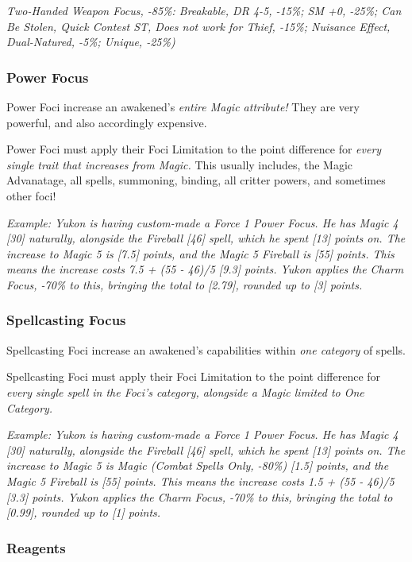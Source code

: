 \begin{multicols*}{2}
	\textcolor{OliveGreen}{\textit{Two-Handed Weapon Focus, -85\%: Breakable, DR 4-5, -15\%; SM +0, -25\%; Can Be Stolen, Quick Contest ST, Does not work for Thief, -15\%; Nuisance Effect, Dual-Natured, -5\%; Unique, -25\%)}}
	
	\subsubsection{Power Focus} Power Foci increase an awakened's \textit{entire Magic attribute!} They are very powerful, and also accordingly expensive.
	
	Power Foci must apply their Foci Limitation to the point difference for \textit{every single trait that increases from Magic.} This usually includes, the Magic Advanatage, all spells, summoning, binding, all critter powers, and sometimes other foci!
	
	\textcolor{OliveGreen}{\textit{Example: Yukon is having custom-made a Force 1 Power Focus. He has Magic 4 [30] naturally, alongside the Fireball [46] spell, which he spent [13] points on. The increase to Magic 5 is [7.5] points, and the Magic 5 Fireball is [55] points. This means the increase costs 7.5 + (55 - 46)/5 [9.3] points. Yukon applies the Charm Focus, -70\% to this, bringing the total to [2.79], rounded up to [3] points.}}
	
	\subsubsection{Spellcasting Focus} Spellcasting Foci increase an awakened's capabilities within \textit{one category} of spells.
	
	Spellcasting Foci must apply their Foci Limitation to the point difference for \textit{every single spell in the Foci's category, alongside a Magic limited to One Category.}
	
	\textcolor{OliveGreen}{\textit{Example: Yukon is having custom-made a Force 1 Power Focus. He has Magic 4 [30] naturally, alongside the Fireball [46] spell, which he spent [13] points on. The increase to Magic 5 is Magic (Combat Spells Only, -80\%) [1.5] points, and the Magic 5 Fireball is [55] points. This means the increase costs 1.5 + (55 - 46)/5 [3.3] points. Yukon applies the Charm Focus, -70\% to this, bringing the total to [0.99], rounded up to [1] points.}}
	
	\subsubsection{Reagents}
	

\end{multicols*}

